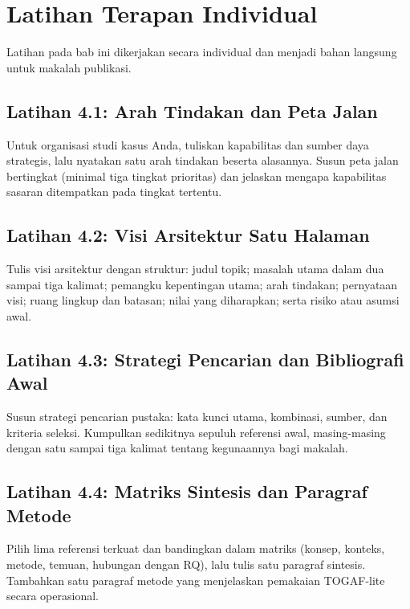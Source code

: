 \section{Latihan Terapan Individual}

Latihan pada bab ini dikerjakan secara individual dan menjadi bahan langsung
untuk makalah publikasi.

\subsection*{Latihan 4.1: Arah Tindakan dan Peta Jalan}

Untuk organisasi studi kasus Anda, tuliskan kapabilitas dan sumber daya
strategis, lalu nyatakan satu arah tindakan beserta alasannya. Susun peta jalan
bertingkat (minimal tiga tingkat prioritas) dan jelaskan mengapa kapabilitas
sasaran ditempatkan pada tingkat tertentu.

\subsection*{Latihan 4.2: Visi Arsitektur Satu Halaman}

Tulis visi arsitektur dengan struktur: judul topik; masalah utama dalam
dua sampai tiga kalimat; pemangku kepentingan utama; arah tindakan; pernyataan
visi; ruang lingkup dan batasan; nilai yang diharapkan; serta risiko atau asumsi
awal.

\subsection*{Latihan 4.3: Strategi Pencarian dan Bibliografi Awal}

Susun strategi pencarian pustaka: kata kunci utama, kombinasi, sumber, dan
kriteria seleksi. Kumpulkan sedikitnya sepuluh referensi awal, masing-masing
dengan satu sampai tiga kalimat tentang kegunaannya bagi makalah.

\subsection*{Latihan 4.4: Matriks Sintesis dan Paragraf Metode}

Pilih lima referensi terkuat dan bandingkan dalam matriks (konsep, konteks,
metode, temuan, hubungan dengan RQ), lalu tulis satu paragraf sintesis. Tambahkan
satu paragraf metode yang menjelaskan pemakaian TOGAF-lite secara operasional.

